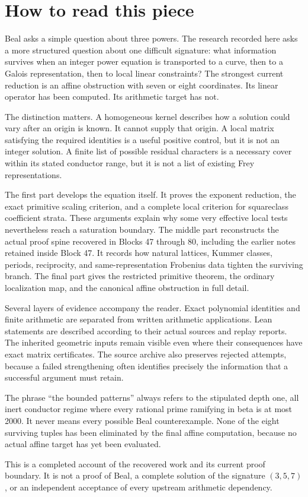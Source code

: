 \section*{How to read this piece}
Beal asks a simple question about three powers. The research recorded here asks a more structured question about one difficult signature: what information survives when an integer power equation is transported to a curve, then to a Galois representation, then to local linear constraints? The strongest current reduction is an affine obstruction with seven or eight coordinates. Its linear operator has been computed. Its arithmetic target has not.

The distinction matters. A homogeneous kernel describes how a solution could vary after an origin is known. It cannot supply that origin. A local matrix satisfying the required identities is a useful positive control, but it is not an integer solution. A finite list of possible residual characters is a necessary cover within its stated conductor range, but it is not a list of existing Frey representations.

The first part develops the equation itself. It proves the exponent reduction, the exact primitive scaling criterion, and a complete local criterion for squareclass coefficient strata. These arguments explain why some very effective local tests nevertheless reach a saturation boundary. The middle part reconstructs the actual proof spine recovered in Blocks 47 through 80, including the earlier notes retained inside Block 47. It records how natural lattices, Kummer classes, periods, reciprocity, and same-representation Frobenius data tighten the surviving branch. The final part gives the restricted primitive theorem, the ordinary localization map, and the canonical affine obstruction in full detail.

Several layers of evidence accompany the reader. Exact polynomial identities and finite arithmetic are separated from written arithmetic applications. Lean statements are described according to their actual sources and replay reports. The inherited geometric inputs remain visible even where their consequences have exact matrix certificates. The source archive also preserves rejected attempts, because a failed strengthening often identifies precisely the information that a successful argument must retain.

The phrase ``the bounded patterns'' always refers to the stipulated depth one, all inert conductor regime where every rational prime ramifying in beta is at most 2000. It never means every possible Beal counterexample. None of the eight surviving tuples has been eliminated by the final affine computation, because no actual affine target has yet been evaluated.

This is a completed account of the recovered work and its current proof boundary. It is not a proof of Beal, a complete solution of the signature $(3,5,7)$, or an independent acceptance of every upstream arithmetic dependency.
